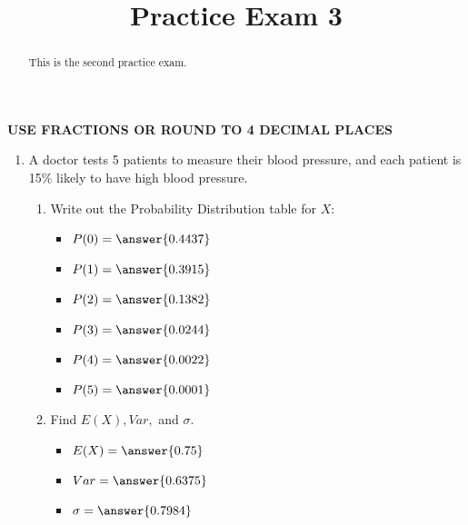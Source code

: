 \documentclass{ximera}
\title{Practice Exam 3}
\begin{document}
      
\begin{abstract}
      
This is the second practice exam.
      
\end{abstract}
      
\maketitle
       
 
 
 
 \textbf{USE FRACTIONS OR ROUND TO 4 DECIMAL PLACES}
 
\begin{enumerate}
\item A doctor tests 5 patients to measure their blood pressure, and each patient is 15\% likely to have high blood pressure.
\begin{enumerate}
\item Write out the Probability Distribution table for $X$:
\begin{itemize}
\item $P(0)=\answer{0.4437}$
\item $P(1)=\answer{0.3915}$
\item $P(2)=\answer{0.1382}$
\item $P(3)=\answer{0.0244}$
\item $P(4)=\answer{0.0022}$
\item $P(5)=\answer{0.0001}$
\end{itemize}



\item Find $E(X), Var,$ and $\sigma$.
\begin{itemize}
\item $E(X)=\answer{0.75}$
\item $Var=\answer{0.6375}$
\item $\sigma=\answer{0.7984}$
\end{itemize}




\end{enumerate}
\end{enumerate}
\end{document}
